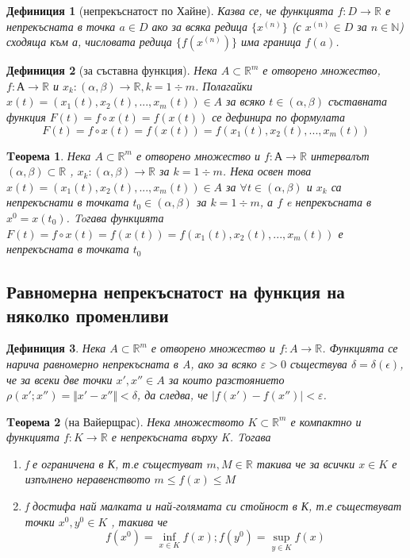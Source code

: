 \documentclass[a4paper,fleqn,12pt]{article}
\newtheorem{theorem}{Tеорема}[subsection]
\newtheorem{definition}{Дефиниция}[subsection]
\begin{document}
\begin{definition}[непрекъснатост по Хайне]
Казва се, че функцията $f: D \to \mathbb{R}$ е непрекъсната в точка $a \in D$ ако за всяка редица  $\{x^{(n)}\}$ (с $x^{(n)} \in D$ за $n \in \mathbb{N}$) сходяща към а, числовата редица $\{f(x^{(n)})\}$ има граница $f(a)$. 
\end{definition}

\begin{definition}[за съставна функция]
Нека $A \subset \mathbb{R}^m$ е отворено множество, $f: А \to \mathbb{R}$ и $x_k: (\alpha, \beta) \to \mathbb{R}, k = 1 \div m$. Полагайки  $x(t) = (x_1(t), x_2(t), ... , x_m(t)) \in A$ за всяко $t \in (\alpha, \beta)$ съставната функция $F(t) = f \circ x(t) = f(x(t))$ се дефинира по формулата 
$$F(t) = f \circ x(t) = f(x(t)) = f(x_1(t), x_2(t), ... , x_m(t))$$
\end{definition}

\begin{theorem}
Нека $A \subset \mathbb{R}^m$ е отворено множество и $f: А \to \mathbb{R}$ интервалът $(\alpha, \beta) \subset \mathbb{R}$ , $x_k: (\alpha, \beta) \to \mathbb{R} $ за $k = 1 \div m$. Нека освен това $x(t) = (x_1(t), x_2(t), ... , x_m(t)) \in A$ за $\forall t \in (\alpha, \beta)$ и $x_k$ са непрекъснати в точката $t_0 \in (\alpha, \beta) $  за $k = 1 \div m$, а $f$ e непрекъсната в $x^0 = x(t_0)$. Toгава функцията $F(t) = f \circ x(t) = f(x(t)) = f(x_1(t), x_2(t), ... , x_m(t))$ е непрекъсната в точката $t_0$
\end{theorem}

\subsection{Равномерна непрекъснатост на функция на няколко променливи}
\begin{definition}
Нека $A \subset \mathbb{R}^m$ е отворено множество и $f: A \to \mathbb{R}$. Функцията се нарича равномерно непрекъсната в A, ако за  всяко $\varepsilon > 0$ съществува $\delta = \delta(\epsilon)$, че за всеки две точки $x', x'' \in A$ за които разстоянието $\rho(x';x'') =\Vert x' - x'' \Vert < \delta $, да следва, че $\vert f(x') - f(x'') \vert  < \varepsilon$.
\end{definition}

\begin{theorem}[на Вайерщрас]
Нека множеството $K \subset \mathbb{R}^m$ е компактно и функцията $f: K \to \mathbb{R}$ е непрекъсната върху K. Tогава 

\begin{enumerate}
		\item f е ограничена в К, т.е същестуват $m, M \in \mathbb{R}$ такива че за всички $x \in K$ е изпълнено неравенството
$m \leq f(x) \leq M$
		\item f достифа най малката и най-голямата си стойност в К, т.е съществуват точки $x^0, y^0 \in K$ , такива че
$$f(x^0) = \inf _{x \in K}f(x) ; f(y^0) = \sup_{y \in K} f(x)$$
\end{enumerate}

\end{theorem}
\end{document}
